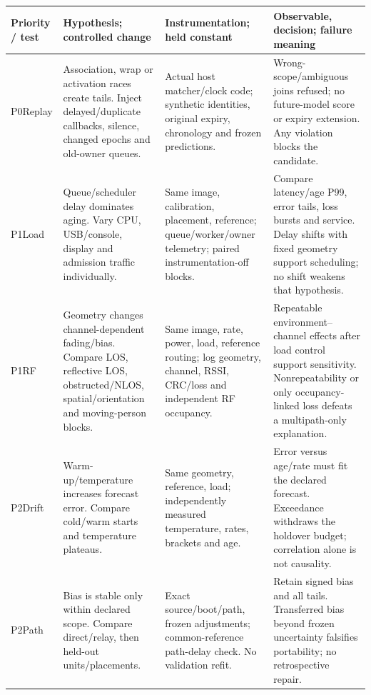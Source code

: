 \documentclass[11pt,letterpaper]{article}
\begin{document}
\begin{center}\small
\renewcommand{\arraystretch}{1.16}\setlength{\tabcolsep}{4pt}
\begin{tabular}{L{.09\linewidth}L{.255\linewidth}L{.28\linewidth}L{.285\linewidth}}\toprule
Priority / test & Hypothesis; controlled change & Instrumentation; held constant & Observable, decision; failure meaning\\\midrule
P0\newline Replay & Association, wrap or activation races create tails. Inject delayed/duplicate callbacks, silence, changed epochs and old-owner queues. & Actual host matcher/clock code; synthetic identities, original expiry, chronology and frozen predictions. & Wrong-scope/ambiguous joins refused; no future-model score or expiry extension. Any violation blocks the candidate.\\
P1\newline Load & Queue/scheduler delay dominates aging. Vary CPU, USB/console, display and admission traffic individually. & Same image, calibration, placement, reference; queue/worker/owner telemetry; paired instrumentation-off blocks. & Compare latency/age P99, error tails, loss bursts and service. Delay shifts with fixed geometry support scheduling; no shift weakens that hypothesis.\\
P1\newline RF & Geometry changes channel-dependent fading/bias. Compare LOS, reflective LOS, obstructed/NLOS, spatial/orientation and moving-person blocks. & Same image, rate, power, load, reference routing; log geometry, channel, RSSI, CRC/loss and independent RF occupancy. & Repeatable environment--channel effects after load control support sensitivity. Nonrepeatability or only occupancy-linked loss defeats a multipath-only explanation.\\
P2\newline Drift & Warm-up/temperature increases forecast error. Compare cold/warm starts and temperature plateaus. & Same geometry, reference, load; independently measured temperature, rates, brackets and age. & Error versus age/rate must fit the declared forecast. Exceedance withdraws the holdover budget; correlation alone is not causality.\\
P2\newline Path & Bias is stable only within declared scope. Compare direct/relay, then held-out units/placements. & Exact source/boot/path, frozen adjustments; common-reference path-delay check. No validation refit. & Retain signed bias and all tails. Transferred bias beyond frozen uncertainty falsifies portability; no retrospective repair.\\

\end{tabular}
\end{center}
\end{document}
